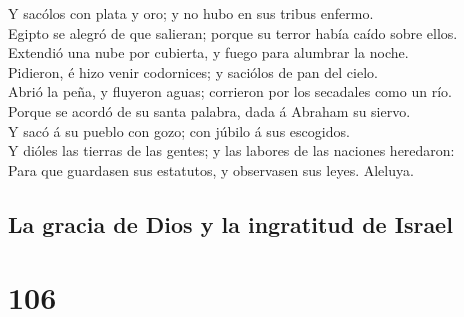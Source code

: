  Y sacólos con plata y oro; y no hubo en sus tribus
enfermo.\\
 Egipto se alegró de que salieran; porque su terror había
caído sobre ellos.\\
 Extendió una nube por cubierta, y fuego para alumbrar la
noche.\\
 Pidieron, é hizo venir codornices; y saciólos de pan del
cielo.\\
 Abrió la peña, y fluyeron aguas; corrieron por los
secadales como un río.\\
 Porque se acordó de su santa palabra, dada á Abraham su
siervo.\\
 Y sacó á su pueblo con gozo; con júbilo á sus
escogidos.\\
 Y dióles las tierras de las gentes; y las labores de las
naciones heredaron:\\
 Para que guardasen sus estatutos, y observasen sus
leyes. Aleluya.

\hypertarget{la-gracia-de-dios-y-la-ingratitud-de-israel}{%
\subsection{La gracia de Dios y la ingratitud de
Israel}\label{la-gracia-de-dios-y-la-ingratitud-de-israel}}

\hypertarget{section-105}{%
\section{106}\label{section-105}}

